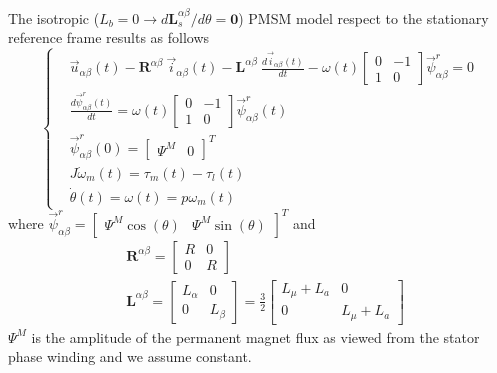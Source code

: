 \documentclass[11pt,a4paper,oneside]{book}
\numberwithin{equation}{section}
\theoremstyle{it}
\theoremstyle{definition}
\begin{document}
\begin{mybox}
	The isotropic ($L_b=0 \rightarrow 
	d\mathbf{L}_s^{\alpha\beta}/d\theta=\mathbf{0}$) PMSM model respect to the 
	stationary reference frame results as follows
	\begin{equation}\label{twophase_eq1tris}
		\left\lbrace \begin{aligned}
			& \vec{u}_{\alpha\beta}(t)-\mathbf{R}^{\alpha\beta}\ 
			\vec{i}_{\alpha\beta}(t)-\mathbf{L}^{\alpha\beta}\ 
			\frac{d\vec{i}_{\alpha\beta}(t)}{dt}-\omega(t) \begin{bmatrix} 0 & 
				-1 \\ 1 & 0\end{bmatrix} \vec{\psi}^r_{\alpha\beta} = 0 \\[6pt]
			& \frac{d\vec{\psi}^r_{\alpha\beta}(t)}{dt} = \omega(t) 
			\begin{bmatrix} 0 & -1 \\ 1 & 0\end{bmatrix} 
			\vec{\psi}^r_{\alpha\beta}(t) \\[6pt]
			& \vec{\psi}^r_{\alpha\beta}(0) = \begin{bmatrix} \Psi^M &  0 
			\end{bmatrix}^T \\[6pt]
			& J\dot{\omega}_m(t) = \tau_m(t)-\tau_l(t) \\[6pt]
			& \dot{\theta}(t) = \omega(t) = p\omega_m(t)
		\end{aligned} \right. 
	\end{equation}
	where $\vec{\psi}^r_{\alpha\beta} = \begin{bmatrix} \Psi^M\cos(\theta) &  
		\Psi^M\sin(\theta)\end{bmatrix}^T$ and
	\begin{equation*}
		\begin{aligned}
			& \mathbf{R}^{\alpha\beta} = 
			\begin{bmatrix} R &  0 \\
				0 & R
			\end{bmatrix} \\[6pt]
			& \mathbf{L}^{\alpha\beta} = 
			\begin{bmatrix} L_{\alpha} &  0 \\
				0 & L_{\beta}
			\end{bmatrix} = \frac{3}{2}
			\begin{bmatrix} L_\mu+L_a &  0 \\
				0 & L_\mu+L_a
			\end{bmatrix}
		\end{aligned} 
	\end{equation*}
	$\Psi^M$ is the amplitude of the permanent magnet flux as viewed from the 
	stator phase winding and we assume constant.
\end{mybox}
\end{document}

